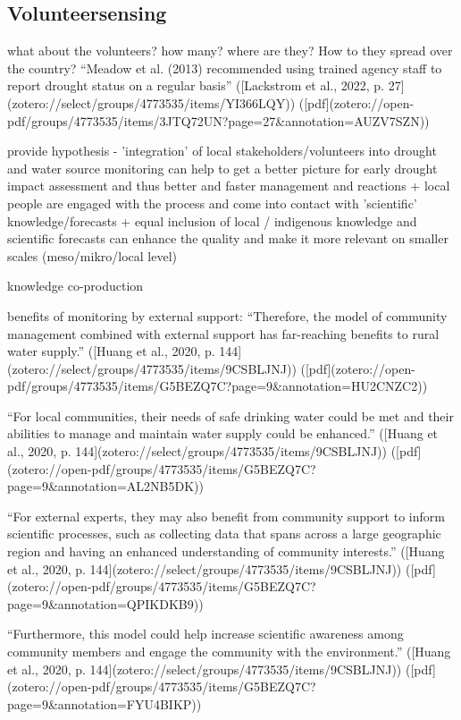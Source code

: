 {\subsection{Volunteersensing}
what about the volunteers? how many? where are they? How to they spread over the country?
“Meadow et al. (2013) recommended using trained agency staff to report drought status on a regular basis” ([Lackstrom et al., 2022, p. 27](zotero://select/groups/4773535/items/YI366LQY)) ([pdf](zotero://open-pdf/groups/4773535/items/3JTQ72UN?page=27\&annotation=AUZV7SZN))

provide hypothesis - 'integration' of local stakeholders/volunteers into drought and water source monitoring can help to get a better picture for early drought impact assessment and thus better and faster management and reactions
+ local people are engaged with the process and come into contact with 'scientific' knowledge/forecasts 
+ equal inclusion of local / indigenous knowledge and scientific forecasts can enhance the quality and make it more relevant on smaller scales (meso/mikro/local level)

knowledge co-production
\autocite{dasInteractiveInformationCrowdsourcing2016}

benefits of monitoring by external support:
“Therefore, the model of community management combined with external support has far-reaching benefits to rural water supply.” ([Huang et al., 2020, p. 144](zotero://select/groups/4773535/items/9CSBLJNJ)) ([pdf](zotero://open-pdf/groups/4773535/items/G5BEZQ7C?page=9&annotation=HU2CNZC2))

“For local communities, their needs of safe drinking water could be met and their abilities to manage and maintain water supply could be enhanced.” ([Huang et al., 2020, p. 144](zotero://select/groups/4773535/items/9CSBLJNJ)) ([pdf](zotero://open-pdf/groups/4773535/items/G5BEZQ7C?page=9&annotation=AL2NB5DK))

“For external experts, they may also benefit from community support to inform scientific processes, such as collecting data that spans across a large geographic region and having an enhanced understanding of community interests.” ([Huang et al., 2020, p. 144](zotero://select/groups/4773535/items/9CSBLJNJ)) ([pdf](zotero://open-pdf/groups/4773535/items/G5BEZQ7C?page=9&annotation=QPIKDKB9))

“Furthermore, this model could help increase scientific awareness among community members and engage the community with the environment.” ([Huang et al., 2020, p. 144](zotero://select/groups/4773535/items/9CSBLJNJ)) ([pdf](zotero://open-pdf/groups/4773535/items/G5BEZQ7C?page=9&annotation=FYU4BIKP))

}
